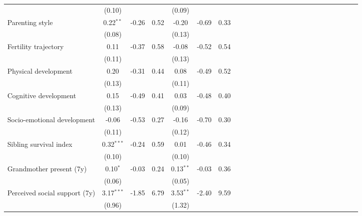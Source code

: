 {\begin{tabular}{l*{6}{SSSS}}
          &   (0.10)&         &         &   (0.09)&         &         \\
Parenting style&0.22$^{**}$&    -0.26&     0.52&    -0.20&    -0.69&     0.33\\
          &   (0.08)&         &         &   (0.13)&         &         \\
Fertility trajectory&     0.11&    -0.37&     0.58&    -0.08&    -0.52&     0.54\\
          &   (0.11)&         &         &   (0.13)&         &         \\
Physical development&     0.20&    -0.31&     0.44&     0.08&    -0.49&     0.52\\
          &   (0.13)&         &         &   (0.11)&         &         \\
Cognitive development&     0.15&    -0.49&     0.41&     0.03&    -0.48&     0.40\\
          &   (0.13)&         &         &   (0.09)&         &         \\
Socio-emotional development&    -0.06&    -0.53&     0.27&    -0.16&    -0.70&     0.30\\
          &   (0.11)&         &         &   (0.12)&         &         \\
Sibling survival index&0.32$^{***}$&    -0.24&     0.59&     0.01&    -0.46&     0.34\\
          &   (0.10)&         &         &   (0.10)&         &         \\
Grandmother present (7y)&0.10$^{*}$&    -0.03&     0.24&0.13$^{**}$&    -0.03&     0.36\\
          &   (0.06)&         &         &   (0.05)&         &         \\
Perceived social support (7y)&3.17$^{***}$&    -1.85&     6.79&3.53$^{**}$&    -2.40&     9.59\\
          &   (0.96)&         &         &   (1.32)&         &         \\
\bottomrule
\end{tabular}
}
